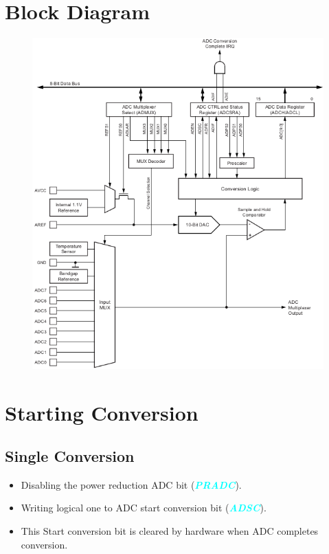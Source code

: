 \documentclass{article}
\newcommand{\bitFormat}[1]{\emph{\textbf{\textcolor{cyan}{#1}}}}
\begin{document}
\newpage
\section{Block Diagram}
\begin{figure}[H]
    \centering
    \includegraphics[height=0.75\textheight]{ADCBlock.png}
\end{figure}

\section{Starting Conversion}
\subsection{Single Conversion}
\begin{itemize}
    \item Disabling the power reduction ADC bit (\bitFormat{PRADC}).
    \item Writing logical one to ADC start conversion bit (\bitFormat{ADSC}).
    \item This Start conversion bit is cleared by hardware when ADC completes conversion.
\end{itemize}
\end{document}
